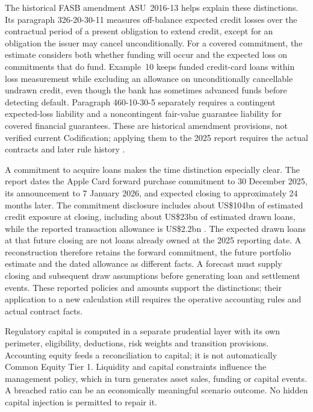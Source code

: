 The historical FASB amendment ASU~2016-13 helps explain these distinctions.
Its paragraph 326-20-30-11 measures off-balance expected credit losses over
the contractual period of a present obligation to extend credit, except for
an obligation the issuer may cancel unconditionally. For a covered commitment,
the estimate considers both whether funding will occur and the expected loss
on commitments that do fund. Example~10 keeps funded credit-card loans within
loss measurement while excluding an allowance on unconditionally cancellable
undrawn credit, even though the bank has sometimes advanced funds before
detecting default. Paragraph 460-10-30-5 separately requires a contingent
expected-loss liability and a noncontingent fair-value guarantee liability
for covered financial guarantees. These are historical amendment provisions,
not verified current Codification; applying them to the 2025 report requires
the actual contracts and later rule history
\citep[PDF pp.~2, 108, 118, 144, 173--176]{fasb2016asu}.

A commitment to acquire loans makes the time distinction especially clear.
The report dates the Apple Card forward purchase commitment to 30 December
2025, its announcement to 7 January 2026, and expected closing to
approximately 24 months later. The commitment disclosure includes about
US\$104bn of estimated credit exposure at closing, including about US\$23bn
of estimated drawn loans, while the reported transaction allowance is
US\$2.2bn \citep[pp.~47, 260, 296]{jpmorgan2025tenk}. The expected drawn
loans at that future closing are not loans already owned at the 2025 reporting
date. A reconstruction therefore retains the forward commitment, the future
portfolio estimate and the dated allowance as different facts. A forecast
must supply closing and subsequent draw assumptions before generating loan
and settlement events. These reported policies and amounts support the
distinctions; their application to a new calculation still requires the
operative accounting rules and actual contract facts.

Regulatory capital is computed in a separate prudential layer with its own
perimeter, eligibility, deductions, risk weights and transition provisions.
Accounting equity feeds a reconciliation to capital; it is not automatically
Common Equity Tier 1. Liquidity and capital constraints influence the
management policy, which in turn generates asset sales, funding or capital
events. A breached ratio can be an economically meaningful scenario outcome.
No hidden capital injection is permitted to repair it.

